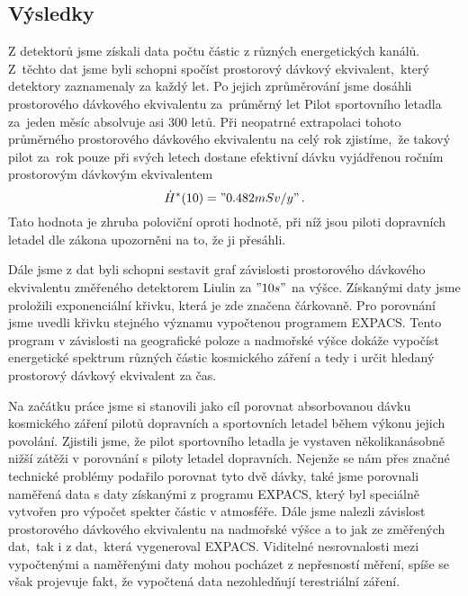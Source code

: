\documentclass[12pt,a4paper]{article}
\begin{document}
\subsection*{Výsledky}
Z detektorů jsme získali data počtu částic z různých energetických kanálů.
Z~těchto dat jsme byli schopni spočíst prostorový dávkový ekvivalent,~který
detektory zaznamenaly za každý let. Po jejich zprůměrování jsme dosáhli
prostorového dávkového ekvivalentu za~průměrný let
Pilot sportovního letadla za~jeden měsíc absolvuje asi 300 letů. Při neopatrné
extrapolaci tohoto průměrného prostorového dávkového ekvivalentu na celý rok
zjistíme,~že takový pilot za~rok pouze při svých letech dostane efektivní dávku
vyjádřenou ročním prostorovým dávkovým ekvivalentem
$$ \dot{H}^\ast(10)="0.482 mSv/y"\,. $$
Tato hodnota je zhruba poloviční oproti hodnotě, při níž jsou piloti dopravních
letadel dle zákona upozorněni na to, že ji přesáhli.\par
Dále jsme z dat byli schopni sestavit graf závislosti prostorového dávkového
ekvivalentu změřeného detektorem Liulin za $"10 s"$ na výšce. Získanými daty
jsme proložili exponenciální křivku, která je zde značena čárkovaně. Pro
porovnání jsme uvedli křivku stejného významu vypočtenou programem EXPACS.
Tento program v závislosti na geografické poloze a nadmořské výšce dokáže
vypočíst energetické spektrum různých částic kosmického záření a tedy i určit
hledaný prostorový dávkový ekvivalent za čas.

\begin{center}
\end{center}
Na začátku práce jsme si stanovili jako cíl porovnat absorbovanou dávku
kosmického záření pilotů dopravních a sportovních letadel během výkonu jejich
povolání. Zjistili jsme, že pilot sportovního letadla je vystaven
několikanásobně nižší zátěži v porovnání s piloty letadel dopravních. Nejenže se
nám přes značné technické problémy podařilo porovnat tyto dvě dávky, také jsme
porovnali naměřená data s daty získanými z programu EXPACS, který byl speciálně
vytvořen pro výpočet spekter částic v atmosféře. Dále jsme nalezli závislost
prostorového dávkového ekvivalentu na nadmořské výšce a to jak ze změřených
dat,~tak i z dat,~která vygeneroval EXPACS. Viditelné nesrovnalosti mezi
vypočtenými a naměřenými daty mohou pocházet z nepřesností měření, spíše se
však projevuje fakt, že vypočtená data nezohledňují terestriální záření.\newpage
\end{document}
